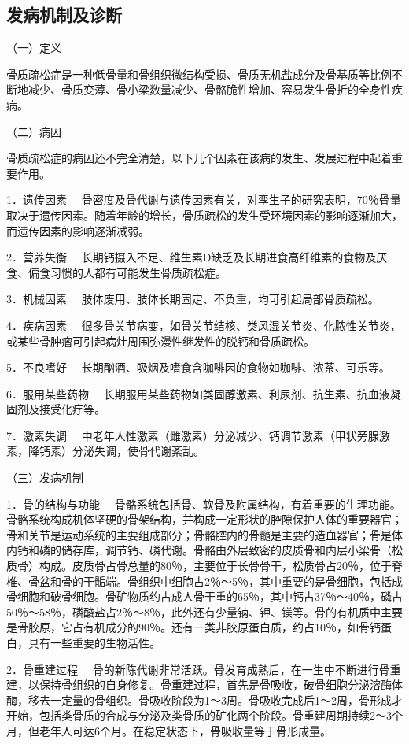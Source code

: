\hypertarget{text00004.htmlux5cux23mllj35}{%
\subsection{发病机制及诊断}\label{text00004.htmlux5cux23mllj35}}

（一）定义

骨质疏松症是一种低骨量和骨组织微结构受损、骨质无机盐成分及骨基质等比例不断地减少、骨质变薄、骨小梁数量减少、骨骼脆性增加、容易发生骨折的全身性疾病。

（二）病因

骨质疏松症的病因还不完全清楚，以下几个因素在该病的发生、发展过程中起着重要作用。

{1．遗传因素}
　骨密度及骨代谢与遗传因素有关，对孪生子的研究表明，70％骨量取决于遗传因素。随着年龄的增长，骨质疏松的发生受环境因素的影响逐渐加大，而遗传因素的影响逐渐减弱。

{2．营养失衡}
　长期钙摄入不足、维生素D缺乏及长期进食高纤维素的食物及厌食、偏食习惯的人都有可能发生骨质疏松症。

{3．机械因素} 　肢体废用、肢体长期固定、不负重，均可引起局部骨质疏松。

{4．疾病因素}
　很多骨关节病变，如骨关节结核、类风湿关节炎、化脓性关节炎，或某些骨肿瘤可引起病灶周围弥漫性继发性的脱钙和骨质疏松。

{5．不良嗜好} 　长期酗酒、吸烟及嗜食含咖啡因的食物如咖啡、浓茶、可乐等。

{6．服用某些药物}
　长期服用某些药物如类固醇激素、利尿剂、抗生素、抗血液凝固剂及接受化疗等。

{7．激素失调}
　中老年人性激素（雌激素）分泌减少、钙调节激素（甲状旁腺激素，降钙素）分泌失调，使骨代谢紊乱。

（三）发病机制

{1．骨的结构与功能}
　骨骼系统包括骨、软骨及附属结构，有着重要的生理功能。骨骼系统构成机体坚硬的骨架结构，并构成一定形状的腔隙保护人体的重要器官；骨和关节是运动系统的主要组成部分；骨骼腔内的骨髓是主要的造血器官；骨是体内钙和磷的储存库，调节钙、磷代谢。骨骼由外层致密的皮质骨和内层小梁骨（松质骨）构成。皮质骨占骨总量的80％，主要位于长骨骨干，松质骨占20％，位于脊椎、骨盆和骨的干骺端。骨组织中细胞占2％～5％，其中重要的是骨细胞，包括成骨细胞和破骨细胞。骨矿物质约占成人骨干重的65％，其中钙占37％～40％，磷占50％～58％，磷酸盐占2％～8％，此外还有少量钠、钾、镁等。骨的有机质中主要是骨胶原，它占有机成分的90％。还有一类非胶原蛋白质，约占10％，如骨钙蛋白，具有一些重要的生物活性。

{2．骨重建过程}
　骨的新陈代谢非常活跃。骨发育成熟后，在一生中不断进行骨重建，以保持骨组织的自身修复。骨重建过程，首先是骨吸收，破骨细胞分泌溶酶体酶，移去一定量的骨组织。骨吸收阶段为1～3周。骨吸收完成后1～2周，骨形成才开始，包括类骨质的合成与分泌及类骨质的矿化两个阶段。骨重建周期持续2～3个月，但老年人可达6个月。在稳定状态下，骨吸收量等于骨形成量。

